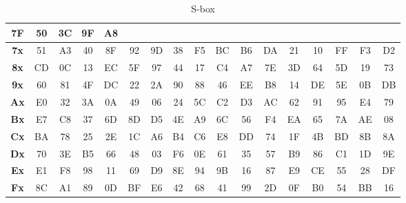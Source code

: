 \documentclass[peerreview]{IEEEtran}
\begin{document}
\begin{table}[ht]
{\begin{tabular}{|c|c|c|c|c|c|c|c|c|c|c|c|c|c|c|c|c|}
      7F         & 50         & 3C         & 9F         & A8                        \\ \hline
      \textbf{7x} & 51         & A3         & 40         & 8F         & 92         &
      9D         & 38         & F5         & BC         & B6         & DA         &
      21         & 10         & FF         & F3         & D2                        \\ \hline
      \textbf{8x} & CD         & 0C         & 13         & EC         & 5F         &
      97         & 44         & 17         & C4         & A7         & 7E         &
      3D         & 64         & 5D         & 19         & 73                        \\ \hline
      \textbf{9x} & 60         & 81         & 4F         & DC         & 22         &
      2A         & 90         & 88         & 46         & EE         & B8         &
      14         & DE         & 5E         & 0B         & DB                        \\ \hline
      \textbf{Ax} & E0         & 32         & 3A         & 0A         & 49         &
      06         & 24         & 5C         & C2         & D3         & AC         &
      62         & 91         & 95         & E4         & 79                        \\ \hline
      \textbf{Bx} & E7         & C8         & 37         & 6D         & 8D         &
      D5         & 4E         & A9         & 6C         & 56         & F4         &
      EA         & 65         & 7A         & AE         & 08                        \\ \hline
      \textbf{Cx} & BA         & 78         & 25         & 2E         & 1C         &
      A6         & B4         & C6         & E8         & DD         & 74         &
      1F         & 4B         & BD         & 8B         & 8A                        \\ \hline
      \textbf{Dx} & 70         & 3E         & B5         & 66         & 48         &
      03         & F6         & 0E         & 61         & 35         & 57         &
      B9         & 86         & C1         & 1D         & 9E                        \\ \hline
      \textbf{Ex} & E1         & F8         & 98         & 11         & 69         &
      D9         & 8E         & 94         & 9B         & 16         & 87         &
      E9         & CE         & 55         & 28         & DF                        \\ \hline
      \textbf{Fx} & 8C         & A1         & 89         & 0D         & BF         &
      E6         & 42         & 68         & 41         & 99         & 2D         &
      0F         & B0         & 54         & BB         & 16                        \\ \hline
    \end{tabular}
  }
  \caption{S-box}
  \label{tab:cuadro4}
\end{table}
\end{document}
